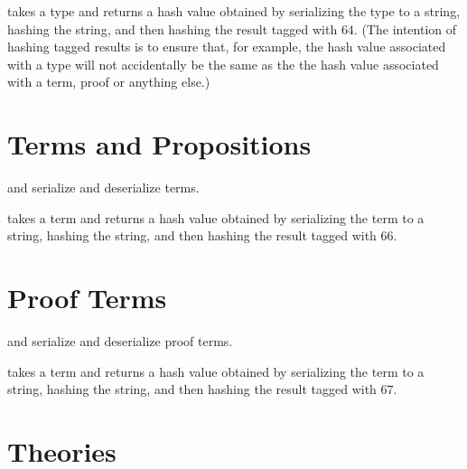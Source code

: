{} takes a type and returns a hash value obtained by serializing the type
to a string, hashing the string, and then hashing the result tagged with $64$.
(The intention of hashing tagged results is to ensure that, for example, the hash value
associated with a type will not accidentally be the same as the the hash value associated
with a term, proof or anything else.)

\section{Terms and Propositions}

{}

{} and {} serialize and deserialize terms.

{} takes a term and returns a hash value obtained by serializing the term
to a string, hashing the string, and then hashing the result tagged with $66$.

{}

\section{Proof Terms}

{}

{} and {} serialize and deserialize proof terms.

{} takes a term and returns a hash value obtained by serializing the term
to a string, hashing the string, and then hashing the result tagged with $67$.

{}

\section{Theories}

{}
{}
{}

